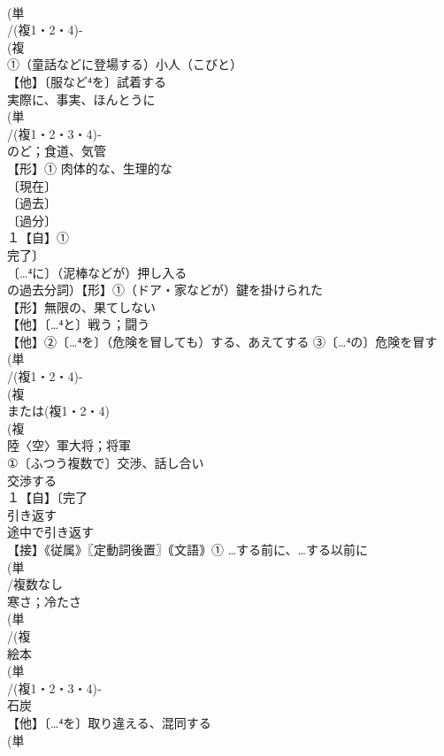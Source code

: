 \documentclass[8pt]{extreport}
\begin{document}
\begin{CJK}{UTF8}{min}
\\	(単
\\	/(複1・2・4)-
\\	(複
\\	①（童話などに登場する）小人（こびと） 
\\	【他】〔服など⁴を〕試着する 
\\	実際に、事実、ほんとうに
\\	(単
\\	/(複1・2・3・4)‐
\\	のど；食道、気管 
\\	【形】① 肉体的な、生理的な 
\\	〔現在〕
\\	〔過去〕
\\	〔過分〕
\\	１【自】①
\\	完了〕
\\	〔…⁴に〕（泥棒などが）押し入る
\\	の過去分詞）【形】①（ドア・家などが）鍵を掛けられた 
\\	【形】無限の、果てしない 
\\	【他】〔…⁴と〕戦う；闘う 
\\	【他】②〔…⁴を〕（危険を冒しても）する、あえてする ③〔…⁴の〕危険を冒す
\\	(単
\\	/(複1・2・4)-
\\	(複
\\	または(複1・2・4)
\\	(複
\\	陸〈空〉軍大将；将軍 
\\	①〔ふつう複数で〕交渉、話し合い 
\\	交渉する
\\	１【自】〔完了
\\	引き返す 
\\	途中で引き返す
\\	【接】《従属》〖定動詞後置〗｟文語｠① …する前に、…する以前に 
\\	(単
\\	/複数なし 
\\	寒さ；冷たさ 
\\	(単
\\	/(複
\\	絵本 
\\	(単
\\	/(複1・2・3・4)‐
\\	石炭 
\\	【他】〔…⁴を〕取り違える、混同する 
\\	(単

\end{CJK}
\end{document}

